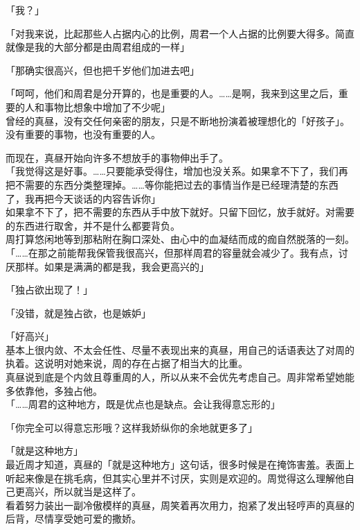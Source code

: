 「我？」

「对我来说，比起那些人占据内心的比例，周君一个人占据的比例要大得多。简直就像是我的大部分都是由周君组成的一样」

「那确实很高兴，但也把千岁他们加进去吧」

「呵呵，他们和周君是分开算的，也是重要的人。……是啊，我来到这里之后，重要的人和事物比想象中增加了不少呢」\\

曾经的真昼，没有交任何亲密的朋友，只是不断地扮演着被理想化的「好孩子」。没有重要的事物，也没有重要的人。

而现在，真昼开始向许多不想放手的事物伸出手了。\\

「我觉得这是好事。……只要能承受得住，增加也没关系。如果拿不下了，我们再把不需要的东西分类整理掉。……等你能把过去的事情当作是已经理清楚的东西了，我再把今天谈话的内容告诉你」\\

如果拿不下了，把不需要的东西从手中放下就好。只留下回忆，放手就好。对需要的东西进行取舍，并不是什么都要背负。\\

周打算悠闲地等到那粘附在胸口深处、由心中的血凝结而成的痂自然脱落的一刻。\\

「……在那之前能帮我保管我很高兴，但那样周君的容量就会减少了。我有点，讨厌那样。如果是满满的都是我，我会更高兴的」

「独占欲出现了！」

「没错，就是独占欲，也是嫉妒」

「好高兴」\\

基本上很内敛、不太会任性、尽量不表现出来的真昼，用自己的话语表达了对周的执着。这说明对她来说，周的存在占据了相当大的比重。\\

真昼说到底是个内敛且尊重周的人，所以从来不会优先考虑自己。周非常希望她能多依靠他，多独占他。\\

「……周君的这种地方，既是优点也是缺点。会让我得意忘形的」

「你完全可以得意忘形哦？这样我娇纵你的余地就更多了」

「就是这种地方」\\

最近周才知道，真昼的「就是这种地方」这句话，很多时候是在掩饰害羞。表面上听起来像是在挑毛病，但其实心里并不讨厌，实则是欢迎的。周觉得这么理解他自己更高兴，所以就当是这样了。\\

看着努力装出一副冷傲模样的真昼，周笑着再次用力，抱紧了发出轻哼声的真昼的后背，尽情享受她可爱的撒娇。
